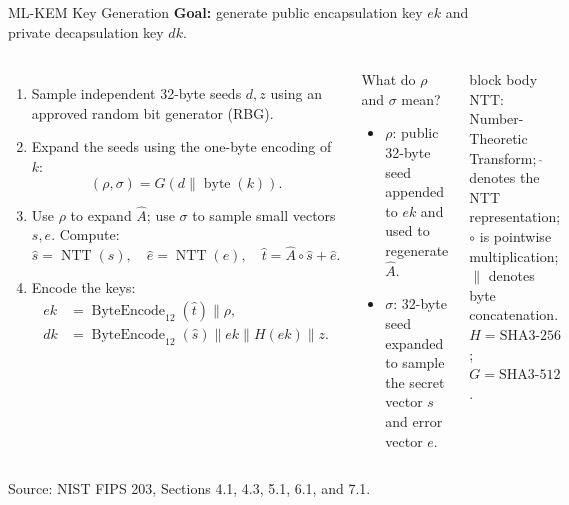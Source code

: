 \documentclass[aspectratio=169,11pt]{beamer}
\newcommand{\source}[1]{\par\vspace{-0.15cm}\hfill{\fontsize{4.5}{5.2}\selectfont\color{Slate!65}Source: NIST FIPS 203, #1.}}
\begin{document}
\begin{frame}{ML-KEM Key Generation}
  \small
  \textbf{Goal:} generate public encapsulation key $ek$ and private decapsulation key $dk$.\par\vspace{0.10cm}
  \begin{columns}[T,onlytextwidth]
      \footnotesize
      \begin{enumerate}
        \setlength{\itemsep}{0.08em}
        \item Sample independent 32-byte seeds $d,z$ using an approved random bit generator (RBG).
        \item Expand the seeds using the one-byte encoding of $k$:
          \[
            (\rho,\sigma)=G(d\parallel\operatorname{byte}(k)).
          \]
        \item Use $\rho$ to expand $\widehat A$; use $\sigma$ to sample small vectors $s,e$. Compute:
          \[
            \widehat s=\operatorname{NTT}(s),\quad
            \widehat e=\operatorname{NTT}(e),\quad
            \widehat t=\widehat A\circ\widehat s+\widehat e.
          \]
        \item Encode the keys:
          \[
            \begin{aligned}
              ek&=\operatorname{ByteEncode}_{12}(\widehat t)\parallel\rho,\\[-1pt]
              dk&=\operatorname{ByteEncode}_{12}(\widehat s)\parallel ek\parallel H(ek)\parallel z.
            \end{aligned}
          \]
      \end{enumerate}
      \begin{alertblock}{What do $\rho$ and $\sigma$ mean?}
        \footnotesize
        \begin{itemize}
          \setlength{\itemsep}{0.22em}
          \item $\rho$: public 32-byte seed appended to $ek$ and used to regenerate $\widehat A$.
          \item $\sigma$: 32-byte seed expanded to sample the secret vector $s$ and error vector $e$.
        \end{itemize}
      \end{alertblock}
      \vspace{0.02cm}
      \begin{beamercolorbox}[rounded=true,sep=0.38em,wd=\linewidth]{block body}
        \scriptsize
        NTT: Number-Theoretic Transform; $\widehat{\;}$ denotes the NTT representation; $\circ$ is pointwise multiplication; $\parallel$ denotes byte concatenation.\\[2pt]
        $H=\mathrm{SHA3\mbox{-}256}$; $G=\mathrm{SHA3\mbox{-}512}$.
      \end{beamercolorbox}
  \end{columns}
  \source{Sections 4.1, 4.3, 5.1, 6.1, and 7.1}
\end{frame}
\end{document}
